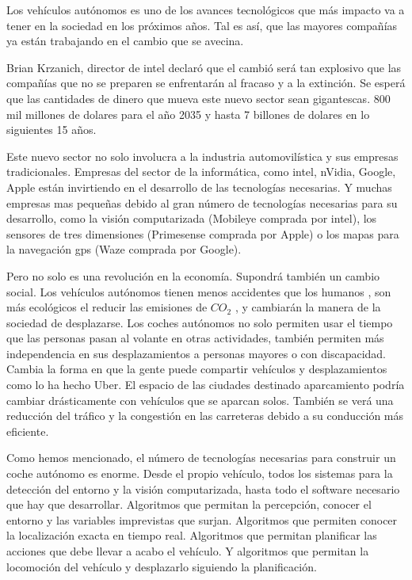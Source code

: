 
Los vehículos autónomos es uno de los avances tecnológicos que más impacto va a tener en la sociedad en los próximos años. Tal es así, que las mayores compañías ya están trabajando en el cambio que se avecina.

Brian Krzanich, director de intel declaró \cite{webtelegraphselfdrivingcars} que el cambió será tan explosivo que las compañías que no se preparen se enfrentarán al fracaso y a la extinción. Se esperá que las cantidades de dinero que mueva este nuevo sector sean gigantescas. 800 mil millones de dolares para el año 2035 y hasta 7 billones de dolares en lo siguientes 15 años. \cite{webtelegraphselfdrivingcars}

Este nuevo sector no solo involucra a la industria automovilística y sus empresas tradicionales. Empresas del sector de la informática, como intel, nVidia, Google, Apple están invirtiendo en el desarrollo de las tecnologías necesarias. Y muchas empresas mas pequeñas debido al gran número de tecnologías necesarias para su desarrollo, como la visión computarizada (Mobileye comprada por intel), los sensores de tres dimensiones (Primesense comprada por Apple) o los mapas para la navegación gps (Waze comprada por Google). \cite{webtechcrunchselfdrivingcars}

Pero no solo es una revolución en la economía. Supondrá también un cambio social. Los vehículos autónomos tienen menos accidentes que los humanos \cite{webfastcompanyselfdrivingcars}, son más ecológicos el reducir las emisiones de $CO_2$ \cite{webbusinessinsiderdrivingcars}, y cambiarán la manera de la sociedad de desplazarse. Los coches autónomos no solo permiten usar el tiempo que las personas pasan al volante en otras actividades, también permiten más independencia en sus desplazamientos a personas mayores o con discapacidad. Cambia la forma en que la gente puede compartir vehículos y desplazamientos como lo ha hecho Uber. El espacio de las ciudades destinado aparcamiento podría cambiar drásticamente con vehículos que se aparcan solos. También se verá una reducción del tráfico y la congestión en las carreteras debido a su conducción más eficiente.

Como hemos mencionado, el número de tecnologías necesarias para construir un coche autónomo es enorme. Desde el propio vehículo, todos los sistemas para la detección del entorno y la visión computarizada, hasta todo el software necesario que hay que desarrollar. Algoritmos que permitan la percepción, conocer el entorno y las variables imprevistas que surjan. Algoritmos que permiten conocer la localización exacta en tiempo real. Algoritmos que permitan planificar las acciones que debe llevar a acabo el vehículo. Y algoritmos que permitan la locomoción del vehículo y desplazarlo siguiendo la planificación.


